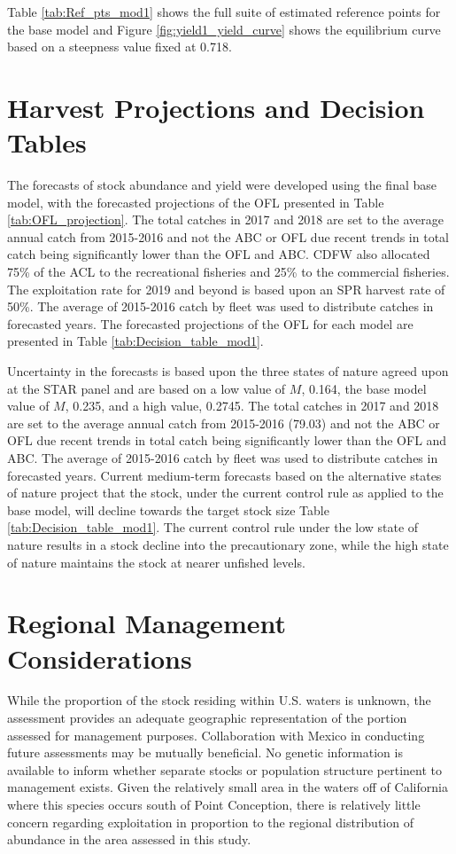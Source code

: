 \documentclass[12pt,]{article}
\begin{document}
Table \ref{tab:Ref_pts_mod1} shows the full suite of estimated reference
points for the base model and Figure \ref{fig:yield1_yield_curve} shows
the equilibrium curve based on a steepness value fixed at 0.718.

\section{Harvest Projections and Decision
Tables}\label{harvest-projections-and-decision-tables}

The forecasts of stock abundance and yield were developed using the
final base model, with the forecasted projections of the OFL presented
in Table \ref{tab:OFL_projection}. The total catches in 2017 and 2018
are set to the average annual catch from 2015-2016 and not the ABC or
OFL due recent trends in total catch being significantly lower than the
OFL and ABC. CDFW also allocated 75\% of the ACL to the recreational
fisheries and 25\% to the commercial fisheries. The exploitation rate
for 2019 and beyond is based upon an SPR harvest rate of 50\%. The
average of 2015-2016 catch by fleet was used to distribute catches in
forecasted years. The forecasted projections of the OFL for each model
are presented in Table \ref{tab:Decision_table_mod1}.

Uncertainty in the forecasts is based upon the three states of nature
agreed upon at the STAR panel and are based on a low value of \(M\),
0.164, the base model value of \(M\), 0.235, and a high value, 0.2745.
The total catches in 2017 and 2018 are set to the average annual catch
from 2015-2016 (79.03) and not the ABC or OFL due recent trends in total
catch being significantly lower than the OFL and ABC. The average of
2015-2016 catch by fleet was used to distribute catches in forecasted
years. Current medium-term forecasts based on the alternative states of
nature project that the stock, under the current control rule as applied
to the base model, will decline towards the target stock size Table
\ref{tab:Decision_table_mod1}. The current control rule under the low
state of nature results in a stock decline into the precautionary zone,
while the high state of nature maintains the stock at nearer unfished
levels.

\section{Regional Management
Considerations}\label{regional-management-considerations}

While the proportion of the stock residing within U.S. waters is
unknown, the assessment provides an adequate geographic representation
of the portion assessed for management purposes. Collaboration with
Mexico in conducting future assessments may be mutually beneficial. No
genetic information is available to inform whether separate stocks or
population structure pertinent to management exists. Given the
relatively small area in the waters off of California where this species
occurs south of Point Conception, there is relatively little concern
regarding exploitation in proportion to the regional distribution of
abundance in the area assessed in this study.
\end{document}
